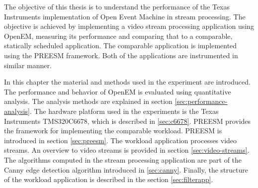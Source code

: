 The objective of this thesis is to understand the performance of the Texas Instruments implementation of Open Event Machine in stream processing. The objective is achieved by implementing a video stream processing application using OpenEM, measuring its performance and comparing that to a comparable, statically scheduled application. The comparable application is implemented using the PREESM framework. Both of the applications are instrumented in similar manner.

In this chapter the material and methods used in the experiment are introduced. The performance and behavior of OpenEM is evaluated using quantitative analysis. The analysis methods are explained in section \ref{sec:performance-analysis}. The hardware platform used in the experiments is the Texas Instruments TMS320C6678, which is described in \ref{sec:c6678}. PREESM provides the framework for implementing the comparable workload. PREESM is introduced in section \ref{sec:preesm}. The workload application processes video streams. An overview to video streams is provided in section \ref{sec:video-streams}. The algorithms computed in the stream processing application are part of the Canny edge detection algorithm introduced in \ref{sec:canny}. Finally, the structure of the workload application is described in the section \ref{sec:filterapp}.
